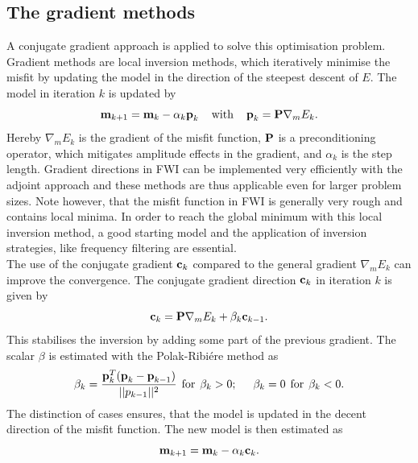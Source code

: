 \subsection*{The gradient methods}
A conjugate gradient approach is applied to solve this optimisation problem. Gradient methods are local inversion methods, which iteratively minimise the misfit by updating the model in the direction of the steepest descent of $E$. The model in iteration $k$ is updated by 
\begin{equation} \textbf m_{k+1}=\textbf m_k-\alpha_k\textbf p_k \hspace{0.4cm}\text{with} \hspace{0.4cm}\textbf p_k=\textbf P\nabla_mE_k. \label{equ:update1} \end{equation}
Hereby $\nabla_mE_k$ is the gradient of the misfit function, $\textbf P$ is a preconditioning operator, which mitigates amplitude effects in the gradient, and $\alpha_k$ is the step length. Gradient directions in FWI can be implemented very efficiently with the adjoint approach \citep[e.g.][]{Tar84, Mor87} and these methods are thus applicable even for larger problem sizes. Note however, that the misfit function in FWI is generally very rough and contains local minima. In order to reach the global minimum with this local inversion method, a good starting model and the application of inversion strategies, like frequency filtering are essential. \\
The use of the conjugate gradient $\textbf c_k$ compared to the general gradient $\nabla_mE_k$ can improve the convergence. The conjugate gradient direction $\textbf c_k$ in iteration $k$ is given by 
\begin{equation}\textbf c_k=\textbf P\nabla_m E_k+\beta_k\textbf c_{k-1}. \label{equ:conjgrad1} \end{equation} This stabilises the inversion by adding some part of the previous gradient.  The scalar $\beta$ is estimated with the Polak-Ribi\'{e}re method as 
\begin{equation}\beta_k=\frac{\textbf p_k^T(\textbf p_k-\textbf p_{k-1})}{||p_{k-1}||^2}\hspace{0.15cm} \text{for} \hspace{0.15cm}\beta_k>0; \hspace{0.5cm}\beta_k=0 \hspace{0.15cm}\text{for} \hspace{0.15cm}\beta_k<0.\label{equ:beta}\end{equation}
The distinction of cases ensures, that the model is updated in the decent direction of the misfit function. The new model is then estimated as
\begin{equation}\textbf m_{k+1}=\textbf m_k-\alpha_k\textbf c_k. \label{equ:conjgrad2} \end{equation}

